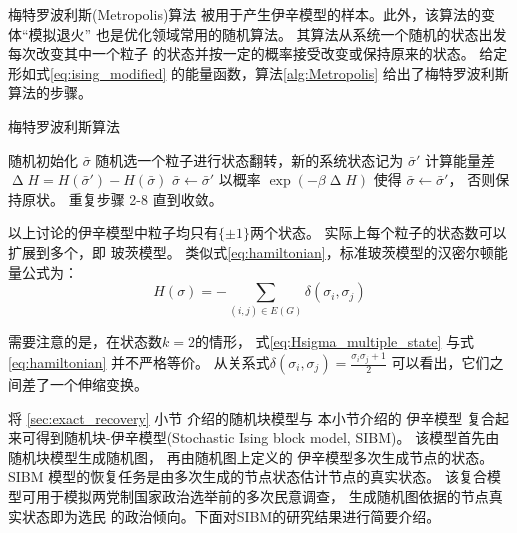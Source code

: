 
梅特罗波利斯(Metropolis)算法\cite{metropolis1953equation}
被用于产生伊辛模型的样本。此外，该算法的变体“模拟退火”
\cite{pincus1970monte} 也是优化领域常用的随机算法。
其算法从系统一个随机的状态出发每次改变其中一个粒子
的状态并按一定的概率接受改变或保持原来的状态。
给定形如式\eqref{eq:ising_modified}
的能量函数，算法\ref{alg:Metropolis}
给出了梅特罗波利斯算法的步骤。

\begin{algorithm}
  \caption{梅特罗波利斯算法}\label{alg:Metropolis}
  \begin{algorithmic}[1]
    \STATE 随机初始化 $\bar{\sigma}$
    \STATE 随机选一个粒子进行状态翻转，新的系统状态记为 $\bar{\sigma}'$ 
    \STATE 计算能量差 $\upDelta H= H(\bar{\sigma}') - H(\bar{\sigma})$
    \STATE $\bar{\sigma} \leftarrow \bar{\sigma}'$
    \ELSE
    \STATE 以概率 $\exp(-\beta \upDelta H)$ 
    使得 $\bar{\sigma} \leftarrow \bar{\sigma}'$，
    否则保持原状。 
    \ENDIF
    \STATE 重复步骤 2-8 直到收敛。
\end{algorithmic}  
\end{algorithm}

以上讨论的伊辛模型中粒子均只有$\{\pm 1\}$两个状态。
实际上每个粒子的状态数可以扩展到多个，即 玻茨模型\cite{potts1952some}。
类似式\eqref{eq:hamiltonian}，标准玻茨模型的汉密尔顿能量公式为：
\begin{equation}\label{eq:Hsigma_multiple_state}
  H(\sigma) = -\sum_{(i,j) \in E(G)}\delta(\sigma_i, \sigma_j)
\end{equation}
\begin{remark}\label{rem:equivalence_H_energy}
需要注意的是，在状态数$k=2$的情形，
式\eqref{eq:Hsigma_multiple_state} 
与式\eqref{eq:hamiltonian}
并不严格等价。
从关系式$\delta(\sigma_i, \sigma_j) = \frac{\sigma_i \sigma_j + 1}{2}$
可以看出，它们之间差了一个伸缩变换。
\end{remark}

将 \ref{sec:exact_recovery} 小节 介绍的随机块模型与 本小节介绍的 伊辛模型
复合起来可得到随机块-伊辛模型(Stochastic Ising block model, SIBM)\cite{ye2020exact}。
该模型首先由 随机块模型生成随机图，
再由随机图上定义的 伊辛模型多次生成节点的状态。
SIBM 模型的恢复任务是由多次生成的节点状态估计节点的真实状态。
该复合模型可用于模拟两党制国家政治选举前的多次民意调查，
生成随机图依据的节点真实状态即为选民
的政治倾向。下面对SIBM的研究结果进行简要介绍。

